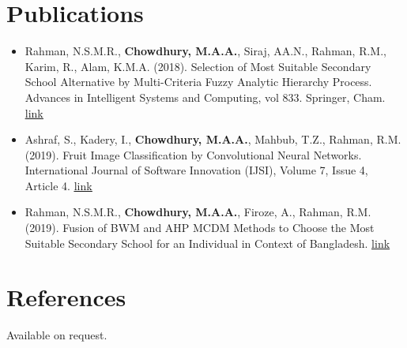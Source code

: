 \documentclass[12pt,a4paper]{article}
\begin{document}

\section{Publications}
 \begin{itemize}[leftmargin=0in, label={}]
    \item{
      Rahman, N.S.M.R., \textbf{Chowdhury, M.A.A.}, Siraj, AA.N., Rahman, R.M., Karim, R., Alam, K.M.A. (2018). Selection of Most Suitable Secondary School Alternative by Multi-Criteria Fuzzy Analytic Hierarchy Process. Advances in Intelligent Systems and Computing, vol 833. Springer, Cham. \href{https://link.springer.com/chapter/10.1007/978-3-319-98678-4_29}{\underline{link}}}
    \item{
      Ashraf, S., Kadery, I., \textbf{Chowdhury, M.A.A.}, Mahbub, T.Z., Rahman, R.M. (2019). Fruit Image Classification by Convolutional Neural Networks. International Journal of Software Innovation (IJSI), Volume 7, Issue 4, Article 4. \href{https://www.igi-global.com/gateway/article/236206}{\underline{link}}}
    \item{
      Rahman, N.S.M.R., \textbf{Chowdhury, M.A.A.}, Firoze, A., Rahman, R.M. (2019). Fusion of BWM and AHP MCDM Methods to Choose the Most Suitable Secondary School for an Individual in Context of Bangladesh. \href{https://link.springer.com/chapter/10.1007/978-3-319-98678-4_29}{\underline{link}} \\
    }
 \end{itemize}

\section{References}
Available on request.
\end{document}
